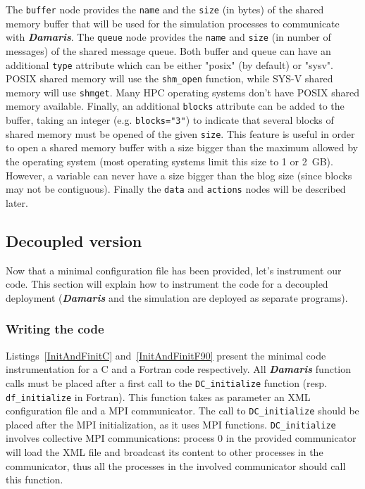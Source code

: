 \documentclass[11pt]{report}
\newcommand{\Damaris}{\emph{\textbf{Damaris}}}
\newcommand{\function}[1]{\texttt{#1}}
\begin{document}
The \texttt{buffer} node provides the \texttt{name} and the \texttt{size} (in bytes) of the shared memory buffer that
will be used for the simulation processes to communicate with \Damaris{}.
The \texttt{queue} node provides the \texttt{name} and \texttt{size} 
(in number of messages) of the shared message queue.
Both buffer and queue can have an additional \texttt{type} attribute which can be either "posix" 
(by default) or "sysv".
POSIX shared memory will use the \function{shm\_open} function, while SYS-V shared memory will
use \function{shmget}. Many HPC operating systems don't have POSIX shared memory available.
Finally, an additional \texttt{blocks} attribute can be added to the buffer, taking an integer (e.g. \texttt{blocks="3"})
to indicate that several blocks of shared memory must be opened of the given \texttt{size}. This feature is
useful in order to open a shared memory buffer 
with a size bigger than the maximum allowed by the operating system (most operating systems limit this size
to 1 or 2~GB).
However, a variable can never have a size bigger than the blog size (since blocks may not be contiguous).
Finally the \texttt{data} and \texttt{actions} nodes will be described later.

\subsection{Decoupled version}

Now that a minimal configuration file has been provided, let's instrument our code.
This section will explain how to instrument the code for a decoupled deployment 
(\Damaris{} and the simulation are deployed as separate programs).

\subsubsection{Writing the code}

Listings~\ref{InitAndFinitC} and~\ref{InitAndFinitF90} present the minimal code instrumentation
for a C and a Fortran code respectively. All \Damaris{} function calls must be placed after a first call to the
\function{DC\_initialize} function (resp. \function{df\_initialize} in Fortran). This function
takes as parameter an XML configuration file 
and a MPI communicator.
The call to \function{DC\_initialize} should be placed after the MPI initialization, as it uses
MPI functions. \function{DC\_initialize} involves collective MPI communications: process 0 in
the provided communicator will load the XML file and broadcast its content to other processes
in the communicator, thus all the processes in the involved communicator should call this function.
\end{document}
